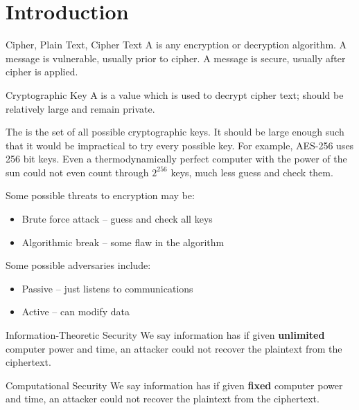 \documentclass[12pt]{report}
\begin{document}
\section{Introduction}

\begin{dfnbox}{Cipher, Plain Text, Cipher Text}{}
    A  is any encryption or decryption algorithm. A  message is vulnerable, usually prior to cipher. A  message is secure, usually after cipher is applied.
\end{dfnbox}

\begin{dfnbox}{Cryptographic Key}{}
    A  is a value which is used to decrypt cipher text; should be relatively large and remain private.
\end{dfnbox}

The  is the set of all possible cryptographic keys. It should be large enough such that it would be impractical to try every possible key. For example, AES-256 uses 256 bit keys. Even a thermodynamically perfect computer with the power of the sun could not even count through $2^{256}$ keys, much less guess and check them.

Some possible threats to encryption may be:
\begin{itemize}
    \item Brute force attack -- guess and check all keys
    \item Algorithmic break -- some flaw in the algorithm
\end{itemize}

Some possible adversaries include:
\begin{itemize}
    \item Passive -- just listens to communications
    \item Active -- can modify data
\end{itemize}

\begin{dfnbox}{Information-Theoretic Security}{}
    We say information has  if given \textbf{unlimited} computer power and time, an attacker could not recover the plaintext from the ciphertext.
\end{dfnbox}

\begin{dfnbox}{Computational Security}{}
    We say information has  if given \textbf{fixed} computer power and time, an attacker could not recover the plaintext from the ciphertext.
\end{dfnbox}
\end{document}
